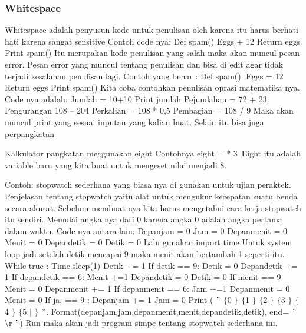 \subsubsection{Whitespace} 
Whitespace adalah penyusun kode untuk penulisan oleh karena itu harus berhati hati karena sangat sensitive
Contoh code nya: 
 	Def spam() 
	Eggs + 12 
 	Return eggs 
 	Print spam() 
Itu merupakan kode penulisan yang salah maka akan muncul pesan error.
Pesan error yang muncul tentang penulisan dan bisa di edit agar tidak terjadi kesalahan penulisan lagi.
Contoh yang benar :  
 	Def spam(): 
 	Eggs = 12 
 	Return eggs 
 	Print spam() 
Kita coba contohkan penulisan oprasi matematika nya.
Code nya adalah: 
	Jumlah = 10+10 
	Print jumlah 
	Pejumlahan = 72 + 23 
	Pengurangan 108 – 204 
	Perkalian = 108 * 0,5 
	Pembagian = 108 / 9 
Maka akan muncul print yang sesuai inputan yang kalian buat. 
Selain itu bisa juga perpangkatan 

Kalkulator pangkatan meggunakan eight 
Contohnya eight = \2** 3\ 
Eight itu adalah variable baru yang kita buat untuk mengeset nilai menjadi 8.

Contoh: stopwatch sederhana yang biasa nya di gunakan untuk ujian peraktek.  
Penjelasan tentang stopwatch yaitu alat untuk mengukur kecepatan suatu benda secara akurat. 
Sebelum membuat nya kita harus mengetahui cara kerja stopwatch itu sendiri. Memulai angka nya dari 0 karena angka 0 adalah angka pertama dalam waktu.
Code nya antara lain:
	Depanjam = 0 
	Jam = 0 
	Depanmenit = 0 
	Menit = 0 
	Depandetik = 0 
	Detik = 0 
Lalu gunakan import time 
Untuk system loop jadi setelah detik mencapai 9 maka menit akan bertambah 1 seperti itu. 
	While true : 
	Time.sleep(1) 
	Detik += 1 
	If detik == 9: 
	Detik = 0 
	Depandetik += 1 
	If depandetik == 6:
	Menit +=1 
	Depandetik = 0 
	Detik = 0 
	If menit == 9: 
	Menit = 0 
	Depanmenit += 1 
	If depanmenit == 6: 
	Jam +=1 
	Depanmenit = 0 
	Menit = 0 
	If ja, == 9 : 
	Depanjam += 1 
	Jam = 0 
Print ( $ " $ $  \{  $0 $  \}  $ $  \{  $1 $  \}  $ $  \{  $2 $  \}  $ $  \{  $3 $  \}  $ $  \{  $4 $  \}  $ $  \{  $5 $  \vert  $ $  \}  $ $ " $. Format(depanjam,jam,depanmenit,menit,depandetik,detik), end= $ " $ $  \setminus  $r $ " $) 
Run maka akan jadi program simpe tentang stopwatch sederhana ini.
